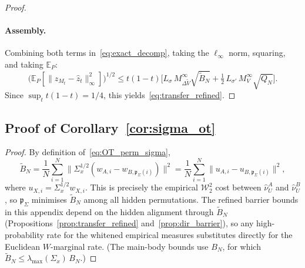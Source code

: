 \documentclass[11pt]{article}
\newcommand{\E}{\mathbb{E}}
\newcommand{\cW}{\mathcal{W}}
\newcommand{\nperm}{\mathfrak{p}}  %
\begin{document}
\begin{proof}
\paragraph{Assembly.}
Combining both terms in~\eqref{eq:exact_decomp},
taking the $\ell_\infty$ norm, squaring, and taking $\E_P$:
\[
  \bigl(\E_P[\|z_{M_t} - \hat z_t\|_\infty^2]\bigr)^{1/2}
  \le t(1-t)\bigl[
    L_\sigma\,M_{\Delta \tilde V}^\infty\sqrt{\tilde B_N}
    + \tfrac{1}{2}\,L_{\sigma'}\,M_V^\infty\sqrt{Q_N}
  \bigr].
\]
Since $\sup_t t(1-t) = 1/4$,
this yields~\eqref{eq:transfer_refined}.
\end{proof}

\subsection{Proof of Corollary~\ref{cor:sigma_ot}}
\begin{proof}
By definition of~\eqref{eq:OT_perm_sigma},
\[
  \tilde B_N
  = \frac{1}{N}\sum_{i=1}^N
    \bigl\|\Sigma_x^{1/2}(w_{A,i} - w_{B,\nperm_{\Sigma}(i)})\bigr\|^2
  = \frac{1}{N}\sum_{i=1}^N
    \|u_{A,i} - u_{B,\nperm_{\Sigma}(i)}\|^2,
\]
where $u_{X,i} = \Sigma_x^{1/2} w_{X,i}$.
This is precisely the empirical $\cW_2^2$ cost between
$\hat\nu_U^A$ and $\hat\nu_U^B$, so $\nperm_{\Sigma}$ minimises
$\tilde B_N$ among all hidden permutations.
The refined barrier bounds in this appendix depend on the hidden
alignment through $\tilde B_N$
(Propositions~\ref{prop:transfer_refined} and~\ref{prop:dir_barrier}),
so any high-probability rate for the whitened empirical measures
substitutes directly for the Euclidean $W$-marginal rate.
(The main-body bounds use $B_N$, for which
$\tilde B_N \le \lambda_{\max}(\Sigma_x)\,B_N$.)
\end{proof}
\end{document}
